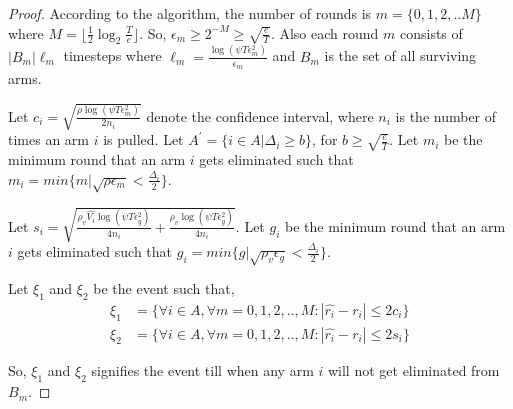 \begin{proof}

According to the algorithm, the number of rounds is $m=\lbrace 0,1,2,.. M\rbrace $ where $M=\bigg\lfloor \frac{1}{2}\log_{2} \frac{T}{e}\bigg\rfloor$. So, $\epsilon_{m}\geq 2^{-M}\geq \sqrt{\frac{e}{T}}$. Also each round $m$ consists of $|B_{m}|\ell_{m}$ timesteps where $\ell_{m} = \frac{\log(\psi T \epsilon_{m}^{2})}{\epsilon_{m}}$ and $B_{m}$ is the set of all surviving arms. 

Let $c_{i} = \sqrt{\frac{\rho\log{(\psi T\epsilon_{m}^{2})}}{2 n_{i}}}$ denote the confidence interval, where $n_{i}$ is the number of times an arm $i$ is pulled. Let $A^{'}=\lbrace i\in A|\Delta_{i}\geq b\rbrace$, for $b\geq \sqrt{\frac{e}{T}}$. Let $m_{i}$ be the minimum round that an arm $i$ gets eliminated such that $m_{i}=min\lbrace m| \sqrt{\rho\epsilon_{m}}<\frac{\Delta_{i}}{2}\rbrace$. 


Let $s_{i}=\sqrt{\frac{\rho_v \hat{V_{i}} \log{(\psi T\epsilon_{g}^{2})}}{4 n_{i}} + \frac{\rho_v \log{(\psi T\epsilon_{g}^{2})}}{4 n_{i}}}$. Let $g_{i}$ be the minimum round that an arm $i$ gets eliminated such that $g_{i}=min\lbrace g| \sqrt{\rho_{v}\epsilon_{g}}<\frac{\Delta_{i}}{2}\rbrace$. 


Let $\xi_{1}$ and $\xi_{2}$ be the event such that,
\begin{align*}
\xi_{1}&=\bigg\lbrace \forall i\in A, \forall m=0,1,2,..,M: |\hat{r_i} - r_i| \leq 2c_i\bigg\rbrace\\
\xi_{2}&=\bigg\lbrace \forall i\in A, \forall m=0,1,2,..,M: |\hat{r_i} - r_i| \leq  2s_i\bigg\rbrace
\end{align*}

So, $\xi_{1}$ and $\xi_{2}$ signifies the event till when any arm $i$ will not get eliminated from $B_m$.




\end{proof}
